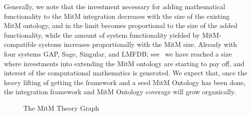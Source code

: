 \documentclass{deliverablereport}
\begin{document}
Generally, we note that the investment necessary for adding mathematical functionality to
the MitM integration decreases with the size of the existing MitM ontology, and in the
limit becomes proportional to the size of the added functionality, while the amount of
system functionality yielded by MitM-compatible systems increases proportionally with the
MitM size. Already with four systems GAP, Sage, Singular, and LMFDB; see~\cite{ODK-D6.5}
we have reached a size where investments into extending the MitM ontology are starting to
pay off, and interest of the computational mathematics is generated. We expect that, once
the heavy lifting of getting the framework and a seed MitM Ontology has been done,
the integration framework and MitM Ontology coverage will grow organically.

\begin{figure}\centering
  \caption{The MitM Theory Graph}\label{fig:MitM-graph}
\end{figure}
\printbibliography
\end{document}
